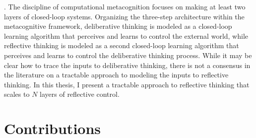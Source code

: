 \cite[]{simon:1982, bertsekas:1995}.  The discipline of computational
metacognition \cite[]{cox_and_raja:2008,cox:2010} focuses on making at
least two layers of closed-loop systems.  Organizing the three-step
architecture within the metacognitive framework, deliberative thinking
is modeled as a closed-loop learning algorithm that perceives and
learns to control the external world, while reflective thinking is
modeled as a second closed-loop learning algorithm that perceives and
learns to control the deliberative thinking process.  While it may be
clear how to trace the inputs to deliberative thinking, there is not a
consensus in the literature on a tractable approach to modeling the
inputs to reflective thinking.  In this thesis, I present a tractable
approach to reflective thinking that scales to $N$ layers of
reflective control.

\section{Contributions}

